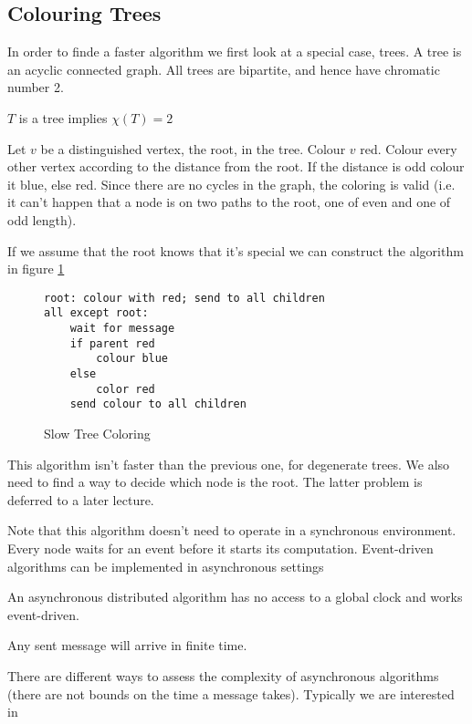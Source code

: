 \subsection{Colouring Trees}

In order to finde a faster algorithm we first look at a special case, trees. A tree is an acyclic connected graph. All trees are bipartite, and hence have chromatic number 2.

\begin{thm} $T$ is a tree implies $\chi(T)=2$ \end{thm}

\begin{pr} Let $v$ be a distinguished vertex, the root, in the tree. Colour $v$ red.  Colour every other vertex according to the distance from the root. If the distance is odd colour it blue, else red. Since there are no cycles in the graph, the coloring is valid (i.e. it can't happen that a node is on two paths to the root, one of even and one of odd length).
\end{pr}

If we assume that the root knows that it's special we can construct the algorithm in figure \ref{alg:slow_tree_colour}

\begin{figure}[hbt]
\begin{lstlisting}
root: colour with red; send to all children
all except root: 
	wait for message
	if parent red
		colour blue
	else
		color red
	send colour to all children
\end{lstlisting}
\caption{Slow Tree Coloring}
\label{alg:slow_tree_colour}
\end{figure}


This algorithm isn't faster than the previous one, for degenerate trees. We also need to find a way to decide which node is the root. The latter problem is deferred to a later lecture.

Note that this algorithm doesn't need to operate in a synchronous environment. Every node waits for an event before it starts its computation. Event-driven algorithms can be implemented in asynchronous settings

\begin{Def}[Asynchronous DA] An asynchronous distributed algorithm has no access to a global clock and works event-driven.

Any sent message will arrive in finite time.
\end{Def}

There are different ways to assess the complexity of asynchronous algorithms (there are not bounds on the time a message takes). Typically we are interested in 

